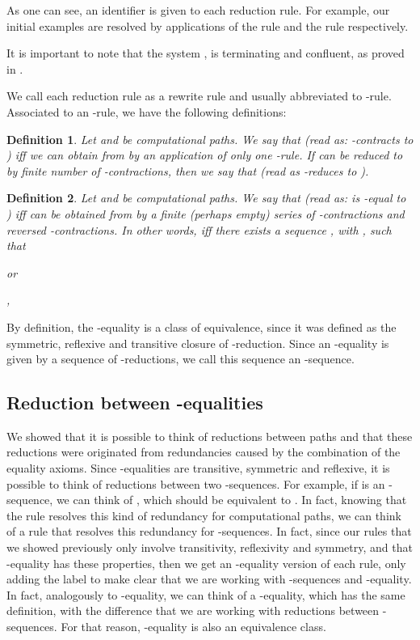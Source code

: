 \documentclass[12pt, a4paper,  oneside, headinclude,footinclude, BCOR5mm]{scrartcl}
\newtheorem{definition}{Definition}[section]
\begin{document}
As one can see, an identifier is given to each reduction rule. For example, our initial examples are resolved by applications of the rule  and the rule  respectively.

It is important to note that the system , is terminating and confluent, as proved in \cite{Anjo1,Ruy2,Ruy3,RuyAnjolinaLivro}.

We call each reduction rule as a rewrite rule and usually abbreviated to -rule. Associated to an -rule, we have the following definitions:

\begin{definition}
Let  and  be computational paths. We say that  (read as:  -contracts to ) iff we can obtain  from  by an application of only one -rule. If  can be reduced to  by finite number of -contractions, then we say that  (read as  -reduces to ).

\end{definition}

\begin{definition}
Let  and  be computational paths. We say that  (read as:  is -equal to ) iff  can be obtained from  by a finite (perhaps empty) series of -contractions and reversed -contractions. In other words,  iff there exists a sequence , with , such that

\centering  or 

\centering  , \quad 
\end{definition}

By definition, the -equality is a class of equivalence, since it was defined as the symmetric, reflexive and transitive closure of -reduction. Since an -equality is given by a sequence of -reductions, we call this sequence an -sequence.

\subsection{Reduction between -equalities}

We showed that it is possible to think of reductions between paths and that these reductions were originated from redundancies caused by the combination of the equality axioms. Since -equalities are transitive, symmetric and reflexive, it is possible to think of reductions between two -sequences. For example, if  is an -sequence, we can think of , which should be equivalent to . In fact, knowing that the  rule resolves this kind of redundancy for computational paths, we can think of a  rule that resolves this redundancy for -sequences. In fact, since our rules that we showed previously only involve transitivity, reflexivity and symmetry, and that -equality has these properties, then we get an -equality version of each rule, only adding the label  to make clear that we are working with -sequences and -equality. In fact, analogously to -equality, we can think of a -equality, which has the same definition, with the difference that we are working with reductions between -sequences. For that reason, -equality is also an equivalence class.
\end{document}
